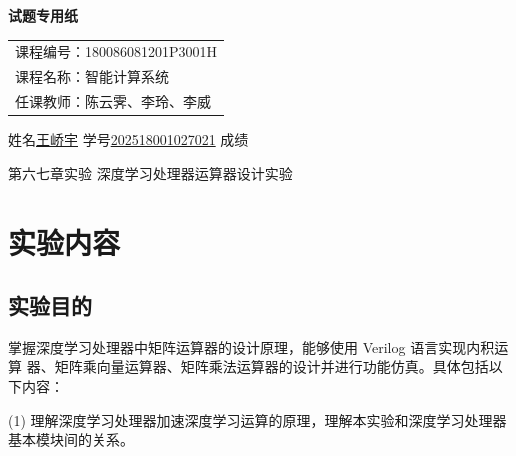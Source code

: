 \documentclass[10pt]{article}
\begin{document}
\vspace{-0.8cm}


\vspace{1cm}


\hspace{1cm}\textbf{\songti{}试题专用纸}
\vspace{-1.5cm}

\begin{flushright}
\begin{tabular}{l}
课程编号：180086081201P3001H \\
课程名称：智能计算系统 \\
任课教师：陈云霁、李玲、李威
\end{tabular}
\end{flushright}

\noindent
{}

\noindent
{\songti{}
姓名\underline{\hspace{1cm}王峤宇\hspace{1cm}}
\hfill
学号\underline{\hspace{1cm}202518001027021\hspace{1cm}}
\hfill
成绩\underline{\hspace{4cm}}
}

\vspace{0.5cm}
\begin{center}
     第六七章实验 \quad 深度学习处理器运算器设计实验
\end{center}


\section{实验内容}

\subsection{实验目的}
掌握深度学习处理器中矩阵运算器的设计原理，能够使用 Verilog 语言实现内积运算
器、矩阵乘向量运算器、矩阵乘法运算器的设计并进行功能仿真。具体包括以下内容：

(1) 理解深度学习处理器加速深度学习运算的原理，理解本实验和深度学习处理器基本模块间的关系。
\end{document}
